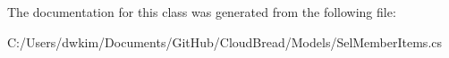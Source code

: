 The documentation for this class was generated from the following file\+:\begin{DoxyCompactItemize}
\item 
C\+:/\+Users/dwkim/\+Documents/\+Git\+Hub/\+Cloud\+Bread/\+Models/Sel\+Member\+Items.\+cs\end{DoxyCompactItemize}
